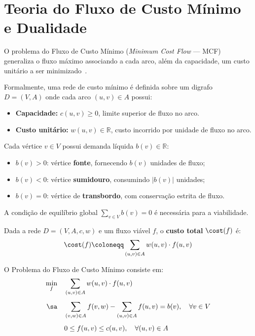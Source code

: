 \chapter{Teoria do Fluxo de Custo Mínimo e Dualidade}\label{sec:mcf_teoria}
\label{sec:mcf}

O problema do Fluxo de Custo Mínimo (\textit{Minimum Cost Flow} --- MCF) generaliza o fluxo máximo associando a cada arco, além da capacidade, um custo unitário a ser minimizado~\cite{ahuja1993network}.

Formalmente, uma rede de custo mínimo é definida sobre um digrafo $D = (V, A)$ onde cada arco $(u,v) \in A$ possui:
\begin{itemize}
    \item \textbf{Capacidade:} $c(u,v) \ge 0$, limite superior de fluxo no arco.
    \item \textbf{Custo unitário:} $w(u,v) \in \mathbb{R}$, custo incorrido por unidade de fluxo no arco.
\end{itemize}

Cada vértice $v \in V$ possui demanda líquida $b(v) \in \mathbb{R}$:
\begin{itemize}
    \item $b(v) > 0$: vértice \textbf{fonte}, fornecendo $b(v)$ unidades de fluxo;
    \item $b(v) < 0$: vértice \textbf{sumidouro}, consumindo $|b(v)|$ unidades;
    \item $b(v) = 0$: vértice de \textbf{transbordo}, com conservação estrita de fluxo.
\end{itemize}

A condição de equilíbrio global $\sum_{v \in V} b(v) = 0$ é necessária para a viabilidade.

\begin{definicao}
Dada a rede $D = (V, A, c, w)$ e um fluxo viável $f$, o \textbf{custo total} $\cost(f)$ é:
\begin{equation}
    \cost(f) \coloneqq \sum_{(u,v) \in A} w(u,v) \cdot f(u,v)
\end{equation}
\end{definicao}

O Problema do Fluxo de Custo Mínimo consiste em:
\begin{align}
    \min_{f} \quad & \sum_{(u,v) \in A} w(u,v) \cdot f(u,v) \label{eq:mcf_obj} \\[4pt]
    \sa \quad & \sum_{(v,w) \in A} f(v,w) - \sum_{(u,v) \in A} f(u,v) = b(v), \quad \forall v \in V \label{eq:mcf_balanco} \\[4pt]
    & 0 \le f(u,v) \le c(u,v), \quad \forall (u,v) \in A \label{eq:mcf_cap}
\end{align}

